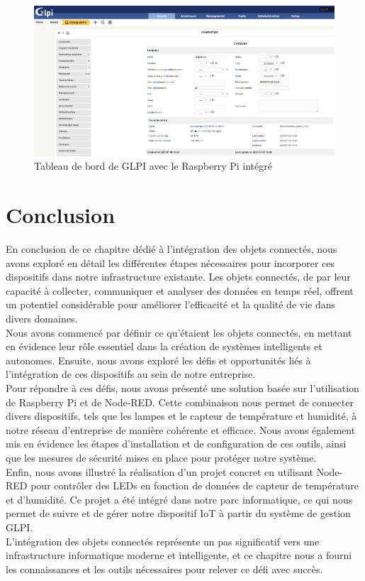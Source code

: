 \begin{figure}[H]
\centering
\includegraphics[width=16.5cm]{Images/RASPBERRYPIGLPI.png}
\caption{Tableau de bord de GLPI avec le Raspberry Pi intégré}
\label{fig:glpi-raspberry}
\end{figure}

\bigskip

\section{Conclusion}

En conclusion de ce chapitre dédié à l'intégration des objets connectés, nous avons exploré en détail les différentes étapes nécessaires pour incorporer ces dispositifs dans notre infrastructure existante. Les objets connectés, de par leur capacité à collecter, communiquer et analyser des données en temps réel, offrent un potentiel considérable pour améliorer l'efficacité et la qualité de vie dans divers domaines. \\

Nous avons commencé par définir ce qu'étaient les objets connectés, en mettant en évidence leur rôle essentiel dans la création de systèmes intelligents et autonomes. Ensuite, nous avons exploré les défis et opportunités liés à l'intégration de ces dispositifs au sein de notre entreprise. \\

Pour répondre à ces défis, nous avons présenté une solution basée sur l'utilisation de Raspberry Pi et de Node-RED. Cette combinaison nous permet de connecter divers dispositifs, tels que les lampes et le capteur de température et humidité, à notre réseau d'entreprise de manière cohérente et efficace. Nous avons également mis en évidence les étapes d'installation et de configuration de ces outils, ainsi que les mesures de sécurité mises en place pour protéger notre système. \\

Enfin, nous avons illustré la réalisation d'un projet concret en utilisant Node-RED pour contrôler des LEDs en fonction de données de capteur de température et d'humidité. Ce projet a été intégré dans notre parc informatique, ce qui nous permet de suivre et de gérer notre dispositif IoT à partir du système de gestion GLPI. \\

L'intégration des objets connectés représente un pas significatif vers une infrastructure informatique moderne et intelligente, et ce chapitre nous a fourni les connaissances et les outils nécessaires pour relever ce défi avec succès. \\